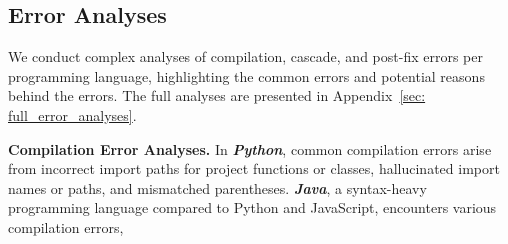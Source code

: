 \subsection{Error Analyses}
\label{sec: error analyses}
% 
We conduct complex analyses of compilation, cascade, and post-fix errors per programming language, highlighting the common errors and potential reasons behind the errors. The full analyses are presented in Appendix~\ref{sec: full_error_analyses}.


\noindent\textbf{Compilation Error Analyses. }
% 
In \textbf{\textit{Python}}, common compilation errors arise from incorrect import paths for project functions or classes, hallucinated import names or paths, and mismatched parentheses.
\textbf{\textit{Java}}, a syntax-heavy programming language compared to Python and JavaScript, encounters various compilation errors, 
